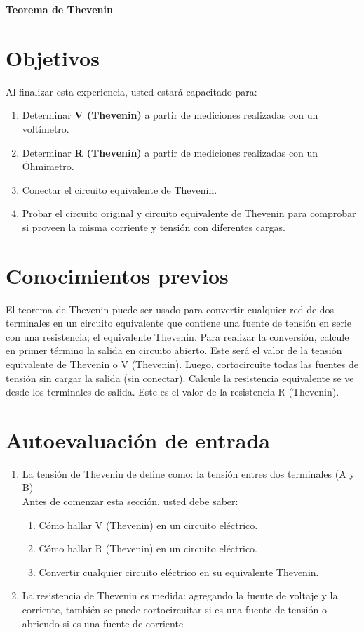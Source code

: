 \thispagestyle{fancy}
\begin{center}
	\LARGE{\textbf{Teorema de Thevenin}}
\end{center}
\section{Objetivos}
Al finalizar esta experiencia, usted estará capacitado para:
\begin{enumerate}
	\item Determinar \textbf{V (Thevenin)} a partir de mediciones realizadas con un voltímetro.
	\item Determinar \textbf{R (Thevenin)} a partir de mediciones realizadas con un Óhmimetro. 
	\item Conectar el circuito equivalente de Thevenin.
	\item Probar el circuito original y circuito equivalente de Thevenin para comprobar si proveen la misma corriente y tensión con diferentes cargas.
\end{enumerate}
\section{Conocimientos previos}
El teorema de Thevenin puede ser usado para convertir cualquier red de dos terminales en un circuito equivalente que contiene una fuente de tensión en serie con una resistencia; el equivalente Thevenin.
Para realizar la conversión, calcule en primer término la salida en circuito abierto. Este será el valor de la tensión equivalente de Thevenin o V (Thevenin).
Luego, cortocircuite todas las fuentes de tensión sin cargar la salida (sin conectar). Calcule la resistencia equivalente se ve desde los terminales de salida. Este es el valor de la resistencia R (Thevenin).
\section{Autoevaluación de entrada}
\begin{enumerate}
	\item La tensión de Thevenin de define como: la tensión entres dos terminales (A y B)
	\\ Antes de comenzar esta sección, usted debe saber:
	\begin{enumerate}
		\renewcommand{\theenumi}{\alph{enumi}}
		\item Cómo hallar V (Thevenin) en un circuito eléctrico.
		\item Cómo hallar R (Thevenin) en un circuito eléctrico.
		\item Convertir cualquier circuito eléctrico en su equivalente Thevenin.
	\end{enumerate}
	\item La resistencia de Thevenin es medida: agregando la fuente de voltaje y la corriente, también se puede cortocircuitar si es una fuente de tensión o abriendo si es una fuente de corriente
\end{enumerate}
